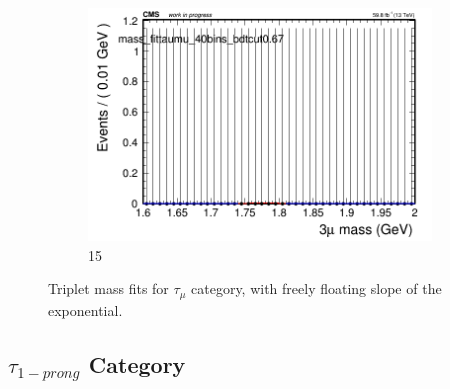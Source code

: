 \begin{figure}[h!]
\begin{subfigure}{0.2\textwidth}
        \includegraphics[width=\textwidth]{power_law/plots/taumu/massfit_taumu_40bins_bdtcut0.67.png}
        \caption{15}
    \end{subfigure}
    \caption{Triplet mass fits for $\tau_{\mu}$ category, with freely floating slope of the exponential.}
    \label{fig:unfixed_taumu}
\end{figure}


\newpage

\subsection{$\tau_{1-prong}$ Category}
\label{sec:tauha}

